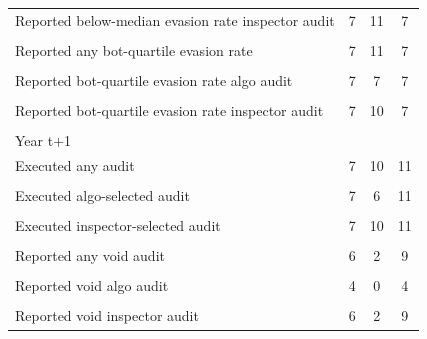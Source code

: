{\begin{tabular}{l*{3}{c}}
Reported below-median evasion rate  inspector audit&           7         &          11         &           7         \\
            &                     &                     &                     \\
Reported any bot-quartile evasion rate&           7         &          11         &           7         \\
            &                     &                     &                     \\
Reported bot-quartile  evasion rate algo audit&           7         &           7         &           7         \\
            &                     &                     &                     \\
Reported bot-quartile  evasion rate  inspector audit&           7         &          10         &           7         \\
            &                     &                     &                     \\
Year t+1    &                     &                     &                     \\
Executed any audit&           7         &          10         &          11         \\
            &                     &                     &                     \\
Executed algo-selected audit&           7         &           6         &          11         \\
            &                     &                     &                     \\
Executed inspector-selected audit&           7         &          10         &          11         \\
            &                     &                     &                     \\
Reported any void audit&           6         &           2         &           9         \\
            &                     &                     &                     \\
Reported void algo audit&           4         &           0         &           4         \\
            &                     &                     &                     \\
Reported void inspector audit&           6         &           2         &           9         \\

\end{tabular}}
